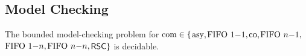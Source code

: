 \subsection{Model Checking}

\begin{theorem}
	\label{thm:bounded_model_checking}
	The bounded model-checking problem for $\textup{com} \in \{$$\text{asy}, $$\text{FIFO } 1\mathsf{-}1, $$\text{co}, $$\text{FIFO } n\mathsf{-}1, $$\text{FIFO } 1\mathsf{-}n, $$\text{FIFO } n\mathsf{-}n, $$\mathsf{RSC}\}$ is decidable.
\end{theorem}

\begin{comment}

Knowing that $\coMSCs$ is MSO-definable, Theorem~\ref{thm:mailbox_bounded_model_checking} can be restated for $\comsymb = \cosymb$.

\begin{theorem}
	\label{thm:co_bounded_model_checking}
	The bounded model-checking problem for $\comsymb =  \cosymb$ is decidable.
\end{theorem}
\begin{proof}
By Proposition~\ref{prop:co_mso}, $\coMSCs=L(\coformula)$. Given a system $\System$, we have that $\coL{\System} = \ppL{\System} \cap L(\coformula)$. Therefore, we can rewrite the bounded model checking problem for $\comsymb = \cosymb$ as

\[\begin{array}{rl}
&\coL{\System} \cap \stwMSCs{k} \subseteq L(\phi)\\[1ex]
\Longleftrightarrow &\ppL{\System} \cap L(\coformula) \cap \stwMSCs{k} \subseteq L(\phi)\\[1ex]
\Longleftrightarrow &\ppL{\System} \cap \stwMSCs{k} \subseteq L(\phi) \cup L(\neg \coformula)\\[1ex]
\Longleftrightarrow &\ppL{\System} \cap \stwMSCs{k} \subseteq L(\phi \vee \neg \coformula)\,.
\end{array}\]
The latter is decidable due to Fact~\ref{p2p}.
\end{proof}

\begin{theorem}
	\label{thm:onen_bounded_model_checking}
	The bounded model-checking problem for $\comsymb =  \onensymb$ is decidable.
\end{theorem}
\begin{proof}
By Proposition~\ref{prop:onen_mso}, $\onenMSCs=L(\onenformula)$. Given a system $\System$, we have that $\onenL{\System} = \ppL{\System} \cap L(\onenformula)$. Therefore, we can rewrite the bounded model checking problem for $\comsymb = \onensymb$ as


\end{comment}
